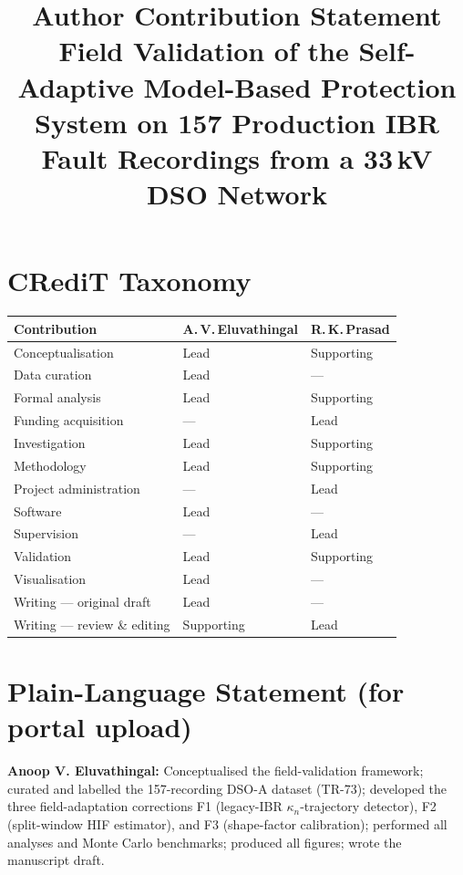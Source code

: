 \documentclass[11pt,a4paper]{article}
\title{\textbf{Author Contribution Statement}\\[4pt]
       \large Field Validation of the Self-Adaptive Model-Based Protection
       System on 157 Production IBR Fault Recordings from a 33\,kV DSO Network}
\author{}
\date{}
\begin{document}
\maketitle\thispagestyle{empty}

\section*{CRediT Taxonomy}

\noindent
\begin{tabular}{@{}p{5.8cm} p{3.0cm} p{3.0cm}@{}}
\toprule
\textbf{Contribution} & \textbf{A.\,V.\,Eluvathingal} & \textbf{R.\,K.\,Prasad} \\
\midrule
Conceptualisation       & Lead   & Supporting \\
Data curation           & Lead   & ---        \\
Formal analysis         & Lead   & Supporting \\
Funding acquisition     & ---    & Lead       \\
Investigation           & Lead   & Supporting \\
Methodology             & Lead   & Supporting \\
Project administration  & ---    & Lead       \\
Software                & Lead   & ---        \\
Supervision             & ---    & Lead       \\
Validation              & Lead   & Supporting \\
Visualisation           & Lead   & ---        \\
Writing --- original draft & Lead & ---       \\
Writing --- review \& editing & Supporting & Lead \\
\bottomrule
\end{tabular}

\bigskip

\section*{Plain-Language Statement (for portal upload)}

\textbf{Anoop V. Eluvathingal:} Conceptualised the field-validation
framework; curated and labelled the 157-recording DSO-A dataset (TR-73);
developed the three field-adaptation corrections F1 (legacy-IBR
$\kappa_n$-trajectory detector), F2 (split-window HIF estimator), and F3
(shape-factor calibration); performed all analyses and Monte Carlo
benchmarks; produced all figures; wrote the manuscript draft.
\end{document}
